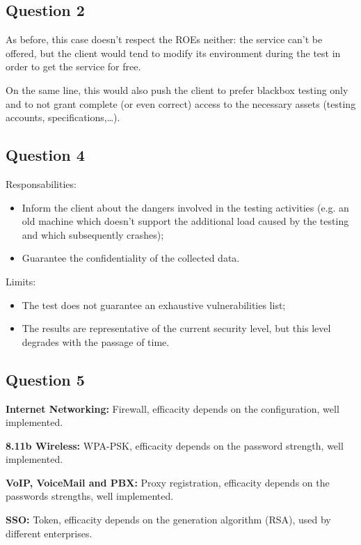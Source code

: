 \documentclass[10pt,a4paper,twoside,onecolumn]{article}
\begin{document}
\subsection{Question 2}

As before, this case doesn't respect the ROEs neither: the service can't be offered, but the client would tend to modify its environment during the test in order to get the service for free.

On the same line, this would also push the client to prefer blackbox testing only and to not grant complete (or even correct) access to the necessary assets (testing accounts, specifications,…).

\subsection{Question 4}

Responsabilities:

\begin{itemize}[noitemsep]
	\item Inform the client about the dangers involved in the testing activities (e.g. an old machine which doesn't support the additional load caused by the testing and which subsequently crashes);
	\item Guarantee the confidentiality of the collected data.
\end{itemize}

Limits:

\begin{itemize}[noitemsep]
	\item The test does not guarantee an exhaustive vulnerabilities list;
	\item The results are representative of the current security level, but this level degrades with the passage of time.
\end{itemize}

\subsection{Question 5}

\begin{description}[itemsep=2mm,topsep=0pt,parsep=0pt,partopsep=0pt]
	\item{\textbf{Internet Networking:}} Firewall, efficacity depends on the configuration, well implemented.
	\item{\textbf{8.11b Wireless:}} WPA-PSK, efficacity depends on the password strength, well implemented.
	\item{\textbf{VoIP, VoiceMail and PBX:}} Proxy registration, efficacity depends on the passwords strengths, well implemented.
	\item{\textbf{SSO:}} Token, efficacity depends on the generation algorithm (RSA), used by different enterprises.
\end{description}
\end{document}
